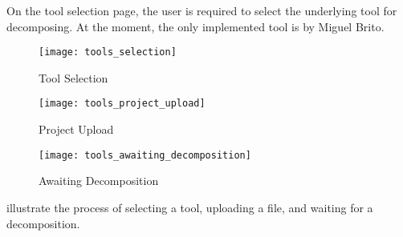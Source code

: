 On the tool selection page, the user is required to select the underlying tool for decomposing. At the moment, the only implemented tool is by Miguel Brito.

\begin{figure*}[!htb]
  \caption{Tool Selection}
  \label{fig:tool_selection}
  \centering
  \texttt{[image: tools\_selection]}
\end{figure*}
\begin{figure*}[!htb]
  \caption{Project Upload}
  \label{fig:project_upload}
  \centering
  \texttt{[image: tools\_project\_upload]}
\end{figure*}
\begin{figure*}[!htb]
  \caption{Awaiting Decomposition}
  \label{fig:awaiting_decomposition}
  \centering
  \texttt{[image: tools\_awaiting\_decomposition]}
\end{figure*}
 illustrate the process of selecting a tool, uploading a file, and waiting for a decomposition.
